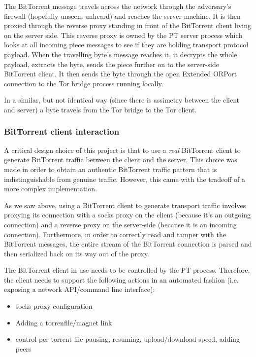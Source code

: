 \documentclass[11pt]{article} %
\begin{document}
The BitTorrent message travels across the network through the adversary's firewall (hopefully unseen, unheard) and reaches the server machine. It is then proxied through the reverse proxy standing in front of the BitTorrent client living on the server side. This reverse proxy is owned by the PT server process which looks at all incoming piece messages to see if they are holding transport protocol payload. When the travelling byte's message reaches it, it decrypts the whole payload, extracts the byte, sends the piece further on to the server-side BitTorrent client. It then sends the byte through the open Extended ORPort connection to the Tor bridge process running locally.

In a similar, but not identical way (since there is assimetry between the client and server) a byte travels from the Tor bridge to the Tor client.

\subsubsection{BitTorrent client interaction}

A critical design choice of this project is that to use a \textit{real} BitTorrent client to generate BitTorrent traffic between the client and the server. This choice was made in order to obtain an authentic BitTorrent traffic pattern that is indistinguishable from genuine traffic. However, this came with the tradeoff of a more complex implementation.

As we saw above, using a BitTorrent client to generate transport traffic involves proxying its connection with a socks proxy on the client (because it's an outgoing connection) and a reverse proxy on the server-side (because it is an incoming connection). Furthermore, in order to correctly read and tamper with the BitTorrent messages, the entire stream of the BitTorrent connection is parsed and then serialized back on its way out of the proxy. 

 The BitTorrent client in use needs to be controlled by the PT process. Therefore, the client needs to support the following actions in an automated fashion (i.e. exposing a network API/command line interface):

\begin{itemize}
\item socks proxy configuration
\item Adding a torrenfile/magnet link
\item control per torrent file pausing, resuming, upload/download speed, adding peers
\end{itemize}
\end{document}
